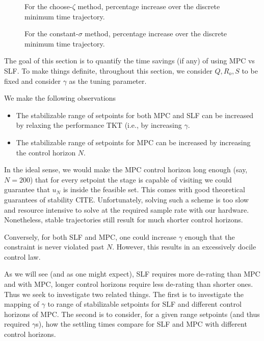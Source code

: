 \documentclass[journal,twocolumn,twoside]{IEEEtran}
\begin{document}
\begin{figure*}
  \begin{minipage}{0.48\textwidth}
    
    \caption{For the choose-$\zeta$ method, percentage increase over the discrete minimum time trajectory.}
  \end{minipage}
  \hfill
  \begin{minipage}{0.48\textwidth}
    
    \caption{For the constant-$\sigma$ method, percentage increase over the discrete minimum time trajectory.}
  \end{minipage}
\end{figure*}


The goal of this section is to quantify the time savings (if any) of using MPC vs SLF. To make things definite, throughout this section, we consider $Q, R_o, S$ to be fixed and consider $\gamma$ as the tuning parameter.

We make the following observations
\begin{itemize}
\item The stabilizable range of setpoints for both MPC and SLF can be increased by relaxing the performance TKT (i.e., by increasing $\gamma$.
\item The stabilizable range of setpoints for MPC can be increased by increasing the control horizon $N$.
\end{itemize}

In the ideal sense, we would make the MPC control horizon long enough (say, $N=200$) that for every setpoint the stage is capable of visiting we could guarantee that $u_N$ is inside the feasible set. This comes with good theoretical guarantees of stability CITE. Unfortunately, solving such a scheme is too slow and resource intensive to solve at the required sample rate with our hardware. Nonetheless, stable trajectories still result for much shorter control horizons. 

Conversely, for both SLF and MPC, one could increase $\gamma$ enough that the constraint is never violated past $N$. However, this results in an excessively docile control law.

As we will see (and as one might expect), SLF requires more de-rating than MPC and with MPC, longer control horizons require less de-rating than shorter ones. Thus we seek to investigate two related things. The first is to investigate the mapping of $\gamma$ to range of stabilizable setpoints for SLF and different control horizons of MPC. The second is to consider, for a given range setpoints (and thus required $\gamma$s), how the settling times compare for SLF and MPC with different control horizons.
\end{document}

